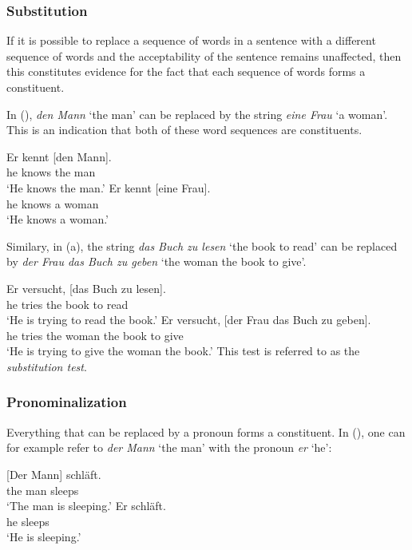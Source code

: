 \subsubsection{Substitution}

If it is possible to replace a sequence of words in a sentence with a different sequence of words and the acceptability of the sentence 
remains unaffected, then this constitutes evidence for the fact that each sequence of words forms a constituent.

In (), \emph{den Mann} `the man' can be replaced by the string \emph{eine Frau} `a woman'. This is an indication that both of
these word sequences are constituents. 

\eal
\ex 
\gll Er kennt [den Mann].\\
     he knows \spacebr{}the man\\
\glt `He knows the man.'
\ex 
\gll Er kennt [eine Frau].\\
     he knows \spacebr{}a woman\\
\glt `He knows a woman.'
\zl

\noindent
Similary, in (a), the string \emph{das Buch zu lesen} `the book to read' can be replaced
by \emph{der Frau das Buch zu geben} `the woman the book to give'.

\eal
\ex\label{ex-das-buch-zu-lesen} 
\gll Er versucht, [das Buch zu lesen].\\
	 he tries \spacebr{}the book to read\\
\glt `He is trying to read the book.'
\ex 
\gll Er versucht, [der Frau das Buch zu geben].\\
	 he tries \spacebr{}the woman the book to give\\
\glt `He is trying to give the woman the book.'
\zl
%
This test is referred to as the \emph{substitution test}.


\subsubsection{Pronominalization}

Everything that can be replaced by a pronoun forms a constituent.
In (), one can for example refer to \emph{der Mann} `the man' with the pronoun \emph{er} `he':

\eal
\ex 
\gll {}[Der Mann] schläft.\\
	 {}\spacebr{}the man sleeps\\
\glt `The man is sleeping.'
\ex 
\gll Er schläft.\\
	 he sleeps\\
\glt `He is sleeping.'
\zl

